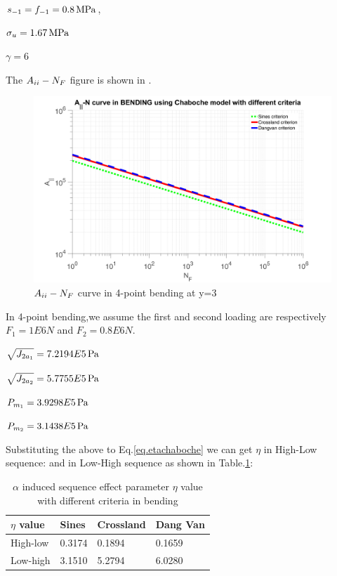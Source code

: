 $s_{-1}=f_{-1}=0.8 \, \textnormal{MPa}$,

$\sigma_{u}=1.67 \, \textnormal{MPa}$ 

$\gamma=6$

The $A_{\uppercase\expandafter{\romannumeral2}}-N_F$ figure is shown in .
\begin{figure}[!h]
	\centering
	\includegraphics[width=\textwidth]{figures//JNbending.png} 
	\caption{$A_{\uppercase\expandafter{\romannumeral2}}-N_F$ curve in 4-point bending at y=3}
	\label{JNbending}
\end{figure}

In 4-point bending,we assume the first and second loading are respectively $F_1=1E6 N$ and $F_2=0.8E6 N$. 

\vspace{6pt}
$\sqrt{J_{2a_1}}=7.2194E5  \, \textnormal{Pa}$

\vspace{6pt}
$\sqrt{J_{2a_2}}=5.7755E5  \, \textnormal{Pa}$

\vspace{6pt}
$P_{m_1}=3.9298E5  \, \textnormal{Pa}$

\vspace{6pt}
$P_{m_2}=3.1438E5  \, \textnormal{Pa}$

Substituting the above to Eq.\eqref{eq.etachaboche} we can get $\eta$ in High-Low sequence:
and in Low-High sequence as shown in Table.\ref{tab.etabending}:
\begin{table}[!h]
	\centering
	\begin{tabular}{llll}
		\hline
		$\eta$ value   & Sines  & Crossland & Dang Van \\ \hline
		High-low & 0.3174 & 0.1894    &  0.1659   \\
		Low-high & 3.1510 & 5.2794   & 6.0280  \\ \hline
	\end{tabular}
	\caption{$\alpha$ induced sequence effect parameter $\eta$ value with different criteria in bending}
	\label{tab.etabending}
\end{table}

